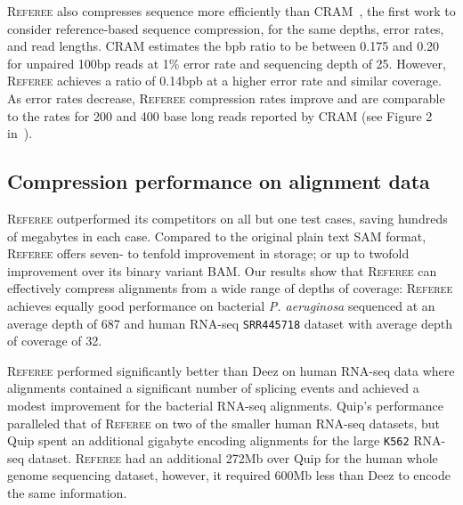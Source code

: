 \documentclass[12pt]{cmuthesis}
\newcommand{\refer}{\textsc{Referee}\xspace}
\begin{document}
  \refer also compresses sequence more efficiently than CRAM~\cite{CRAM}, the first work to consider reference-based sequence compression, for the same depths, error rates, and read lengths. CRAM estimates the bpb ratio to be between 0.175 and 0.20 for unpaired 100bp reads at 1\% error rate and sequencing depth of 25. However, \refer achieves a ratio of 0.14bpb at a higher error rate and similar coverage. As error rates decrease, \refer compression rates improve and are comparable to the rates for 200 and 400 base long reads reported by CRAM (see Figure 2 in~\cite{CRAM}).






  \subsection{Compression performance on alignment data}

  \refer outperformed its competitors on all but one test cases, saving hundreds of megabytes in each case. Compared to the original plain text SAM format, \refer offers seven- to tenfold improvement in storage; or up to twofold improvement over its binary variant BAM.
  Our results show that \refer can effectively compress alignments from a wide range of depths of coverage: \refer achieves equally good performance on bacterial \textit{P. aeruginosa} sequenced at an average depth of 687 and human RNA-seq \texttt{SRR445718} dataset with average depth of coverage of 32.

  \refer performed significantly better than Deez on human RNA-seq data where alignments contained a significant number of splicing events and achieved a modest improvement for the bacterial RNA-seq alignments. Quip's performance paralleled that of \refer on two of the smaller human RNA-seq datasets, but Quip spent an additional gigabyte encoding alignments for the large \texttt{K562} RNA-seq dataset. \refer had an additional 272Mb over Quip for the human whole genome sequencing dataset, however, it required 600Mb less than Deez to encode the same information.
\end{document}
